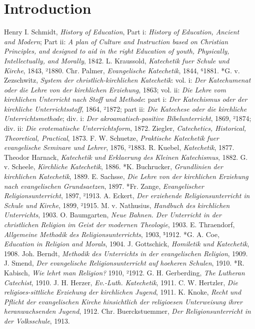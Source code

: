 \chapter{Introduction}

Henry I. Schmidt, \emph{History of Education}, Part i: \emph{History of Education, Ancient and Modern}; Part ii: \emph{A plan of Culture and Instruction based on Christian Principles, and designed to aid in the right Education of youth, Physically, Intellectually, and Morally}, 1842. L. Kraussold, \emph{Katechetik fuer Schule und Kirche}, 1843, ²1880. Chr. Palmer, \emph{Evangelische Katechetik}, 1844, ⁶1881. *G. v. Zezschwitz, \emph{System der christlich-kirchlichen Katechetik}: vol. i: \emph{Der Katechumenat oder die Lehre von der kirchlichen Erziehung}, 1863; vol. ii: \emph{Die Lehre vom kirchlichen Unterricht nach Stoff und Methode}: part i: \emph{Der Katechismus oder der kirchliche Unterrichtsstoff}, 1864, ²1872; part ii: \emph{Die Katechese oder die kirchliche Unterrichtsmethode}; div. i: \emph{Der akroamatisch-positive Bibelunterricht}, 1869, ²1874; div. ii: \emph{Die erotematische Unterrichtsform}, 1872. Ziegler, \emph{Catechetics, Historical, Theoretical, Practical}, 1873. F. W. Schuetze, \emph{Praktische Katechetik fuer evangelische Seminare und Lehrer}, 1876, ²1883. R. Kuebel, \emph{Katechetik}, 1877. Theodor Harnack, \emph{Katechetik und Erklaerung des Kleinen Katechismus}, 1882. G. v. Scheele, \emph{Kirchliche Katechetik}, 1886. *K. Buchrucker, \emph{Grundlinien der kirchlichen Katechetik}, 1889. E. Sachsse, \emph{Die Lehre von der kirchlichen Erziehung nach evangelischen Grundsaetzen}, 1897. *Fr. Zange, \emph{Evangelischer Religionsunterricht}, 1897, ²1913. A. Eckert, \emph{Der erziehende Religionsunterricht in Schule und Kirche}, 1899, ²1915. M. v. Nathusius, \emph{Handbuch des kirchlichen Unterrichts}, 1903. O. Baumgarten, \emph{Neue Bahnen. Der Unterricht in der christlichen Religion im Geist der modernen Theologie}, 1903. E. Thraendorf, \emph{Allgemeine Methodik des Religionsunterrichts}, 1903, ⁵1912. *G. A. Coe, \emph{Education in Religion and Morals}, 1904. J. Gottschick, \emph{Homiletik und Katechetik}, 1908. Joh. Berndt, \emph{Methodik des Unterrichts in der evangelischen Religion}, 1909. J. Smend, \emph{Der evangelische Religionsunterricht auf hoeheren Schulen}, 1910. *R. Kabisch, \emph{Wie lehrt man Religion?} 1910, ²1912. G. H. Gerberding, \emph{The Lutheran Catechist}, 1910. J. H. Herzer, \emph{Ev.-Luth. Katechetik}, 1911. C. W. Hertzler, \emph{Die religioes-sittliche Erziehung der kirchlichen Jugend}, 1911. K. Knoke, \emph{Recht und Pflicht der evangelischen Kirche hinsichtlich der religioesen Unterweisung ihrer heranwachsenden Jugend}, 1912. Chr. Buerckstuemmer, \emph{Der Religionsunterricht in der Volksschule}, 1913.
